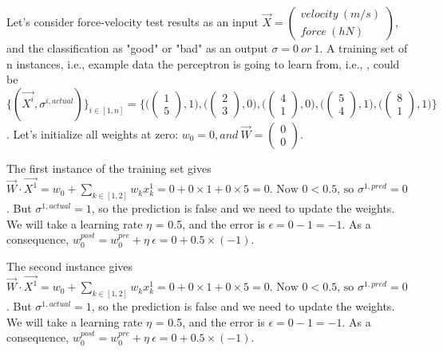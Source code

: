 Let's consider force-velocity test results as an input 
\(\overrightarrow{X} = 
\begin{pmatrix} velocity \ (m/s) \\ force \ (hN) \end{pmatrix} \), and the classification as "good" or "bad" as an output
\( \sigma = 0 \ or \ 1 \).
A  training set of n instances, i.e., example data the perceptron is going to learn from, i.e., , could be 
\( \biggl\{(\overrightarrow{X^i}, \sigma^{i, actual})\biggr\}_{i\in [1,n]}
= \Biggl\{ 
\biggl( \begin{pmatrix} 1 \\ 5 \end{pmatrix}, 1 \biggr),
\biggl( \begin{pmatrix} 2 \\ 3 \end{pmatrix}, 0 \biggr),
\biggl( \begin{pmatrix} 4 \\ 1 \end{pmatrix}, 0 \biggr),
\biggl( \begin{pmatrix} 5 \\ 4 \end{pmatrix}, 1 \biggr), 
\biggl( \begin{pmatrix} 8 \\ 1 \end{pmatrix}, 1 \biggr)
\Biggr\} \).
Let's initialize all weights at zero: \(w_0 = 0, and \ \overrightarrow{W} = \begin{pmatrix} 0 \\ 0 \end{pmatrix} \).

The first instance of the training set gives \( \overrightarrow{W} \cdot \overrightarrow{X^1} = w_0 + \sum_{k \in [1,2]} w_k x^1_k = 0 + 0 \times 1 + 0 \times 5 = 0. \text{ Now } 0 < 0.5 \text{, so } \sigma^{1, pred} = 0 \). But \(\sigma^{1, actual} = 1 \), so the prediction is false and we need to update the weights. We will take a learning rate $\eta$ = 0.5, and the error is \(\epsilon = 0-1=-1\). As a consequence, \( w_0^{post} = w_0^{pre} + \eta \ \epsilon = 0 +0.5 \times (-1)\).

The second instance gives \( \overrightarrow{W} \cdot \overrightarrow{X^1} = w_0 + \sum_{k \in [1,2]} w_k x^1_k = 0 + 0 \times 1 + 0 \times 5 = 0. \text{ Now } 0 < 0.5 \text{, so } \sigma^{1, pred} = 0 \). But \(\sigma^{1, actual} = 1 \), so the prediction is false and we need to update the weights. We will take a learning rate $\eta$ = 0.5, and the error is \(\epsilon = 0-1=-1\). As a consequence, \( w_0^{post} = w_0^{pre} + \eta \ \epsilon = 0 +0.5 \times (-1)\).


